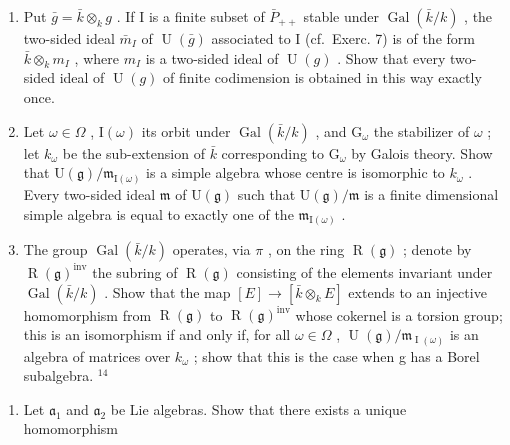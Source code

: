\begin{enumerate}
\def\labelenumi{\alph{enumi})}
\item
  Put \(\bar{g} = \bar{k} \otimes_{k} g\) . If I is a finite subset of \(\bar{P}_{++}\) stable under \(\operatorname{Gal}(\bar{k}/k)\) , the two-sided ideal \(\bar{m}_{I}\) of \(\operatorname{U}(\bar{g})\) associated to I (cf.~Exerc. 7) is of the form \(\bar{k} \otimes_{k} m_{I}\) , where \(m_{I}\) is a two-sided ideal of \(\operatorname{U}(g)\) . Show that every two-sided ideal of \(\operatorname{U}(g)\) of finite codimension is obtained in this way exactly once.
\item
  Let \(\omega \in \Omega\) , \(\mathrm{I}(\omega)\) its orbit under \(\operatorname{Gal}(\bar{k}/k)\) , and \(\mathrm{G}_{\omega}\) the stabilizer of \(\omega\) ; let \(k_{\omega}\) be the sub-extension of \(\bar{k}\) corresponding to \(\mathrm{G}_{\omega}\) by Galois theory. Show that \(\mathrm{U}(\mathfrak{g})/\mathfrak{m}_{\mathrm{I}(\omega)}\) is a simple algebra whose centre is isomorphic to \(k_{\omega}\) . Every two-sided ideal \(\mathfrak{m}\) of \(\mathrm{U}(\mathfrak{g})\) such that \(\mathrm{U}(\mathfrak{g})/\mathfrak{m}\) is a finite dimensional simple algebra is equal to exactly one of the \(\mathfrak{m}_{\mathrm{I}(\omega)}\) .
\item
  The group \(\operatorname{Gal}(\bar{k}/k)\) operates, via \(\pi\) , on the ring \(\operatorname{R}(\mathfrak{g})\) ; denote by \(\operatorname{R}(\mathfrak{g})^{\mathrm{inv}}\) the subring of \(\operatorname{R}(\mathfrak{g})\) consisting of the elements invariant under \(\operatorname{Gal}(\bar{k}/k)\) . Show that the map \([E] \to [\bar{k} \otimes_{k} E]\) extends to an injective homomorphism from \(\operatorname{R}(\mathfrak{g})\) to \(\operatorname{R}(\mathfrak{g})^{\mathrm{inv}}\) whose cokernel is a torsion group; this is an isomorphism if and only if, for all \(\omega \in \Omega\) , \(\operatorname{U}(\mathfrak{g})/\mathfrak{m}_{\operatorname{I}(\omega)}\) is an algebra of matrices over \(k_{\omega}\) ; show that this is the case when g has a Borel subalgebra. \(^{14}\)
\end{enumerate}

\begin{enumerate}
\def\labelenumi{\arabic{enumi})}
\setcounter{enumi}{8}
\tightlist
\item
  Let \(\mathfrak{a}_1\) and \(\mathfrak{a}_2\) be Lie algebras. Show that there exists a unique homomorphism
\end{enumerate}

